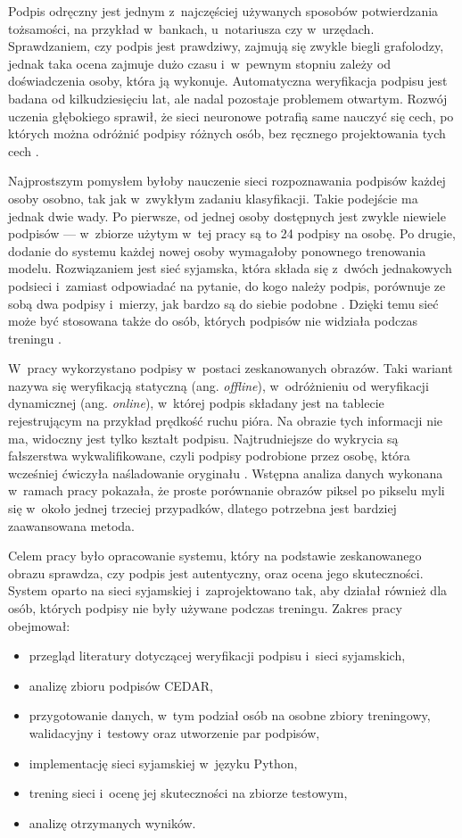 \documentclass[12pt, twoside, openright]{article}
\begin{document}
Podpis odręczny jest jednym z~najczęściej używanych sposobów potwierdzania tożsamości, na przykład w~bankach, u~notariusza czy w~urzędach.
Sprawdzaniem, czy podpis jest prawdziwy, zajmują się zwykle biegli grafolodzy, jednak taka ocena zajmuje dużo czasu i~w~pewnym stopniu zależy od doświadczenia osoby, która ją wykonuje.
Automatyczna weryfikacja podpisu jest badana od kilkudziesięciu lat, ale nadal pozostaje problemem otwartym.
Rozwój uczenia głębokiego sprawił, że sieci neuronowe potrafią same nauczyć się cech, po których można odróżnić podpisy różnych osób, bez ręcznego projektowania tych cech \cite{hafemann2017review}.

Najprostszym pomysłem byłoby nauczenie sieci rozpoznawania podpisów każdej osoby osobno, tak jak w~zwykłym zadaniu klasyfikacji.
Takie podejście ma jednak dwie wady.
Po pierwsze, od jednej osoby dostępnych jest zwykle niewiele podpisów --- w~zbiorze użytym w~tej pracy są to 24 podpisy na osobę.
Po drugie, dodanie do systemu każdej nowej osoby wymagałoby ponownego trenowania modelu.
Rozwiązaniem jest sieć syjamska, która składa się z~dwóch jednakowych podsieci i~zamiast odpowiadać na pytanie, do kogo należy podpis, porównuje ze sobą dwa podpisy i~mierzy, jak bardzo są do siebie podobne \cite{bromley1993}.
Dzięki temu sieć może być stosowana także do osób, których podpisów nie widziała podczas treningu \cite{dey2017}.

W~pracy wykorzystano podpisy w~postaci zeskanowanych obrazów.
Taki wariant nazywa się weryfikacją statyczną (ang. \textit{offline}), w~odróżnieniu od weryfikacji dynamicznej (ang. \textit{online}), w~której podpis składany jest na tablecie rejestrującym na przykład prędkość ruchu pióra.
Na obrazie tych informacji nie ma, widoczny jest tylko kształt podpisu.
Najtrudniejsze do wykrycia są fałszerstwa wykwalifikowane, czyli podpisy podrobione przez osobę, która wcześniej ćwiczyła naśladowanie oryginału \cite{hafemann2017review}.
Wstępna analiza danych wykonana w~ramach pracy pokazała, że proste porównanie obrazów piksel po pikselu myli się w~około jednej trzeciej przypadków, dlatego potrzebna jest bardziej zaawansowana metoda.

Celem pracy było opracowanie systemu, który na podstawie zeskanowanego obrazu sprawdza, czy podpis jest autentyczny, oraz ocena jego skuteczności.
System oparto na sieci syjamskiej i~zaprojektowano tak, aby działał również dla osób, których podpisy nie były używane podczas treningu.
Zakres pracy obejmował:
\begin{itemize}[label={--},leftmargin=1.25cm]
	\item przegląd literatury dotyczącej weryfikacji podpisu i~sieci syjamskich,
	\item analizę zbioru podpisów CEDAR,
	\item przygotowanie danych, w~tym podział osób na osobne zbiory treningowy, walidacyjny i~testowy oraz utworzenie par podpisów,
	\item implementację sieci syjamskiej w~języku Python,
	\item trening sieci i~ocenę jej skuteczności na zbiorze testowym,
	\item analizę otrzymanych wyników.
\end{itemize}
\end{document}
